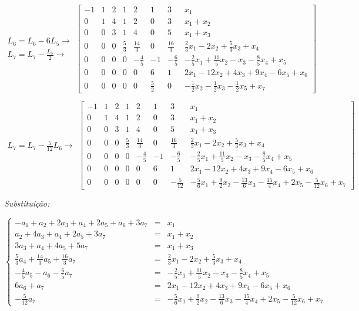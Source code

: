 \documentclass[11pt]{article}
\newenvironment{question}[1]
  {\par\addvspace{\medskipamount}
   \noindent\makebox[0pt][r]{\textbf{#1)} }\ignorespaces}
  {\par\addvspace{\medskipamount}}
\begin{document}
\begin{question}{4}
$$
\substack{
  \mbox{$L_6=L_6-6L_5 \rightarrow$}\\[.5em]
  \mbox{$L_7=L_7-\frac{L_5}{2} \rightarrow$}
}
\left[\begin{array}{rrrrrrr|l}
    -1 & 1 & 2 & 1 & 2 & 1 & 3 & x_1\\
    0 & 1 & 4 & 1 & 2 & 0 & 3 & x_1 + x_2\\
    0 & 0 & 3 & 1 & 4 & 0 & 5 & x_1 + x_3\\
    0 & 0 & 0 & \frac{5}{3} & \frac{14}{3} & 0 & \frac{16}{3} & \frac{2}{3}x_1 - 2 x_2 + \frac{5}{3}x_3 + x_4\\
    0 & 0 & 0 & 0 & - \frac{4}{5} & -1 & - \frac{6}{5} & - \frac{2}{5}x_1 + \frac{11}{5}x_2 - x_3 - \frac{8}{5}x_4 + x_5\\
    0 & 0 & 0 & 0 & 0 & 6 & 1 & 2 x_1 - 12 x_2 + 4 x_3 + 9 x_4 - 6 x_5 + x_6\\
    0 & 0 & 0 & 0 & 0 & \frac{5}{2} & 0 & - \frac{1}{2}x_2 - \frac{1}{2}x_3 - \frac{1}{2}x_5 + x_7
\end{array}\right]
$$

$$
\substack{
  \mbox{$L_7=L_7-\frac{5}{12}L_6 \rightarrow$}
}
\left[\begin{array}{rrrrrrr|l}
    -1 & 1 & 2 & 1 & 2 & 1 & 3 & x_1\\
    0 & 1 & 4 & 1 & 2 & 0 & 3 & x_1 + x_2\\
    0 & 0 & 3 & 1 & 4 & 0 & 5 & x_1 + x_3\\
    0 & 0 & 0 & \frac{5}{3} & \frac{14}{3} & 0 & \frac{16}{3} & \frac{2}{3}x_1 - 2 x_2 + \frac{5}{3}x_3 + x_4\\
    0 & 0 & 0 & 0 & - \frac{4}{5} & -1 & - \frac{6}{5} & - \frac{2}{5}x_1 + \frac{11}{5}x_2 - x_3 - \frac{8}{5}x_4 + x_5\\
    0 & 0 & 0 & 0 & 0 & 6 & 1 & 2 x_1 - 12 x_2 + 4 x_3 + 9 x_4 - 6 x_5 + x_6\\
    0 & 0 & 0 & 0 & 0 & 0 & - \frac{5}{12} & - \frac{5}{6}x_1 + \frac{9}{2}x_2 - \frac{13}{6}x_3 - \frac{15}{4}x_4 + 2 x_5 - \frac{5}{12}x_6 + x_7
\end{array}\right]
$$

\newpage
\textit{Substituição:}

$$
\left\{\begin{array}{rcl}
    -a_1 + a_2 + 2a_3 + a_4 + 2a_5 + a_6 + 3a_7 &= &x_1\\
    a_2 + 4a_3 + a_4 + 2a_5 + 3a_7 &= &x_1 + x_2\\
    3a_3 + a_4 + 4a_5 + 5a_7 &= &x_1 + x_3\\
    \frac{5}{3}a_4 + \frac{14}{3}a_5 + \frac{16}{3}a_7 &= &\frac{2}{3}x_1 - 2 x_2 + \frac{5}{3}x_3 + x_4\\
    -\frac{4}{5}a_5 - a_6 - \frac{6}{5}a_7 &= &-\frac{2}{5}x_1 + \frac{11}{5}x_2 - x_3 - \frac{8}{5}x_4 + x_5\\
    6a_6 + a_7 &= &2 x_1 - 12 x_2 + 4 x_3 + 9 x_4 - 6 x_5 + x_6\\
    -\frac{5}{12}a_7 &= &-\frac{5}{6}x_1 + \frac{9}{2}x_2 - \frac{13}{6}x_3 - \frac{15}{4}x_4 + 2 x_5 - \frac{5}{12}x_6 + x_7
\end{array}\right.
$$


\end{question}
\end{document}

